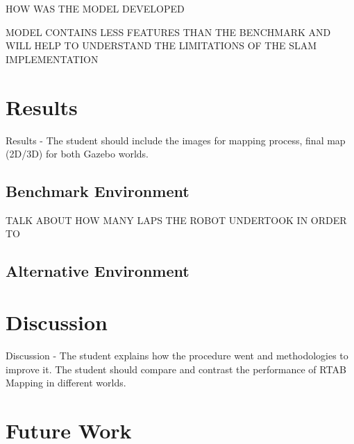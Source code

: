 \documentclass[a4paper]{article}
\begin{document}
HOW WAS THE MODEL DEVELOPED

MODEL CONTAINS LESS FEATURES THAN THE BENCHMARK AND WILL HELP TO UNDERSTAND THE LIMITATIONS OF THE SLAM IMPLEMENTATION


\section{Results}
Results - The student should include the images for mapping process, final map (2D/3D) for both Gazebo worlds.

\subsection{Benchmark Environment}
TALK ABOUT HOW MANY LAPS THE ROBOT UNDERTOOK IN ORDER TO 

\subsection{Alternative Environment}

\section{Discussion}
Discussion - The student explains how the procedure went and methodologies to improve it. The student should compare and contrast the performance of RTAB Mapping in different worlds.


\section{Future Work}




\end{document}
